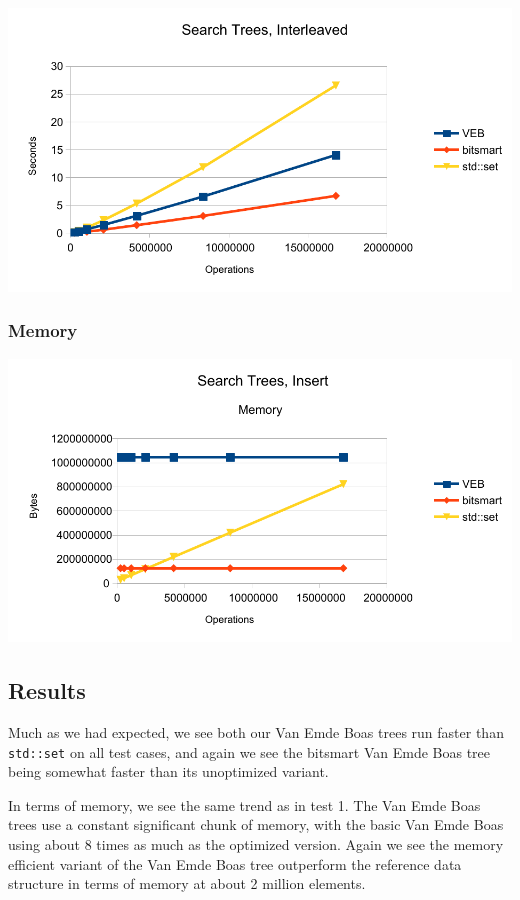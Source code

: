 \includegraphics[width=\textwidth]{graphs/st_interleaved.pdf}

\subsubsection{Memory}
\includegraphics[width=\textwidth]{graphs/st_insert_memory.pdf}

\subsection{Results}

Much as we had expected, we see both our Van Emde Boas trees run faster than \texttt{std::set} on all test cases, and again we see the bitsmart Van Emde Boas tree being somewhat faster than its unoptimized variant.

In terms of memory, we see the same trend as in test 1. The Van Emde Boas trees use a constant significant chunk of memory, with the basic Van Emde Boas using about 8 times as much as the optimized version. Again we see the memory efficient variant of the Van Emde Boas tree outperform the reference data structure in terms of memory at about 2 million elements.